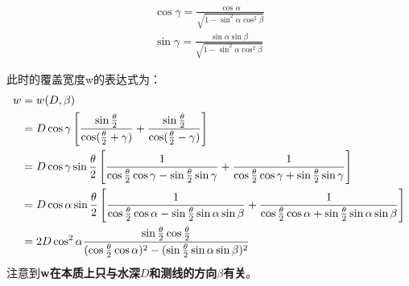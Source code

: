 \documentclass{article}
\begin{document}
	\begin{align}
		\cos\gamma=\frac{\cos\alpha}{\sqrt{1-\sin^2\alpha\cos^2\beta}}\\ 
		\sin\gamma=\frac{\sin\alpha\sin\beta}{\sqrt{1-\sin^2\alpha\cos^2\beta}} 
	\end{align}
	\par 此时的覆盖宽度w的表达式为：
	\begin{align}
		w &= w(D,\beta) \notag   \\
		& = D\cos\gamma\left[\frac{\sin\frac{\theta}{2}}{\cos(\frac{\theta}{2}+\gamma)}  +  \frac{\sin\frac{\theta}{2}}{\cos(\frac{\theta}{2}-\gamma)}\right]  \notag \\
		&=D\cos\gamma\sin\frac{\theta}{2}\left[\frac{1}{\cos\frac{\theta}{2}\cos\gamma-\sin\frac{\theta}{2}\sin\gamma}  	+ \frac{1}{\cos\frac{\theta}{2}\cos\gamma+\sin\frac{\theta}{2}\sin\gamma} \right]  \notag \\
		&=D \cos\alpha \sin\frac{\theta}{2}\left[\frac{1}{\cos\frac{\theta}{2}\cos\alpha-\sin\frac{\theta}{2}\sin\alpha\sin\beta}  
				+ \frac{1}{\cos\frac{\theta}{2}\cos\alpha+\sin\frac{\theta}{2}\sin\alpha\sin\beta}  \right]  \notag  \\
		&= 2 D \cos^2\alpha \frac{\sin\frac{\theta}{2}\cos\frac{\theta}{2}}{(\cos\frac{\theta}{2}\cos\alpha)^2-(\sin\frac{\theta}{2}\sin\alpha\sin\beta)^2}  \label{eqtest}
	\end{align}
%		
	注意到\textbf{w在本质上只与水深$D$和测线的方向$\beta$有关}。
\end{document}
